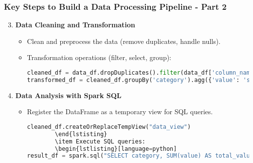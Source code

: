 \documentclass[aspectratio=169]{beamer}
\begin{document}
\begin{frame}[fragile]
  \frametitle{Key Steps to Build a Data Processing Pipeline - Part 2}
  \begin{enumerate}
    \setcounter{enumi}{2} %
    \item \textbf{Data Cleaning and Transformation}
      \begin{itemize}
        \item Clean and preprocess the data (remove duplicates, handle nulls).
        \item Transformation operations (filter, select, group):
        \begin{lstlisting}[language=python]
cleaned_df = data_df.dropDuplicates().filter(data_df['column_name'].isNotNull())
transformed_df = cleaned_df.groupBy('category').agg({'value': 'sum'})
        \end{lstlisting}
      \end{itemize}

    \item \textbf{Data Analysis with Spark SQL}
      \begin{itemize}
        \item Register the DataFrame as a temporary view for SQL queries.
        \begin{lstlisting}[language=python]
cleaned_df.createOrReplaceTempView("data_view")
        \end{lstisting}
        \item Execute SQL queries:
        \begin{lstlisting}[language=python]
result_df = spark.sql("SELECT category, SUM(value) AS total_value FROM data_view GROUP BY category")
        \end{lstlisting}
      \end{itemize}
  \end{enumerate}
\end{frame}
\end{document}
